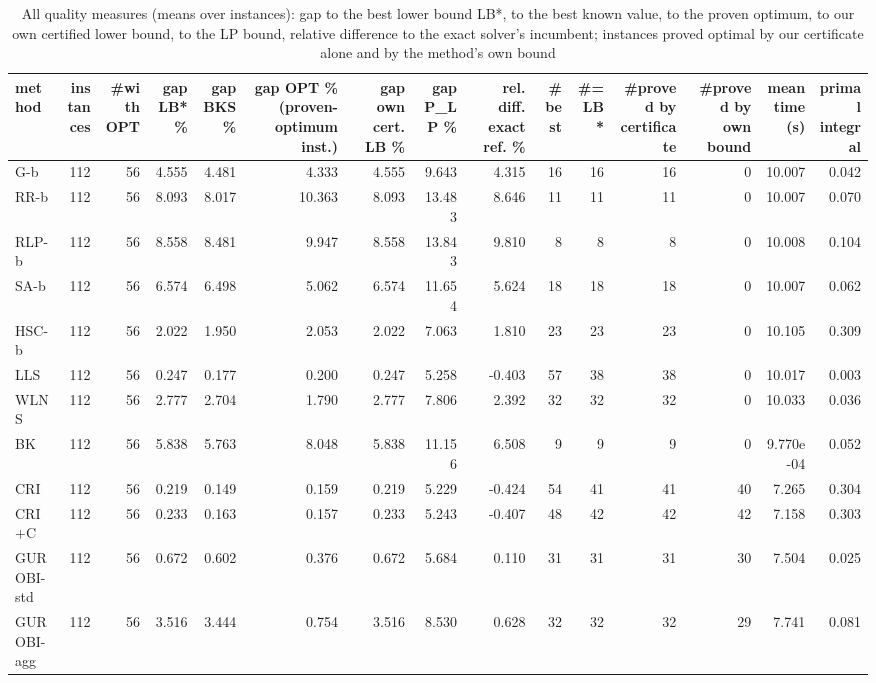 \begin{table}[htbp]
\centering
\small
\caption{All quality measures (means over instances): gap to the best lower bound LB*, to the best known value, to the proven optimum, to our own certified lower bound, to the LP bound, relative difference to the exact solver's incumbent; instances proved optimal by our certificate alone and by the method's own bound}
\label{tab:E4a_equal_budgets_b10_all_metrics}
\begin{tabular}{lrrrrrrrrrrrrrr}
\toprule
method & instances & \#with OPT & gap LB* \% & gap BKS \% & gap OPT \% (proven-optimum inst.) & gap own cert. LB \% & gap P\_LP \% & rel. diff. exact ref. \% & \#best & \#= LB* & \#proved by certificate & \#proved by own bound & mean time (s) & primal integral \\
\midrule
G-b & 112 & 56 & 4.555 & 4.481 & 4.333 & 4.555 & 9.643 & 4.315 & 16 & 16 & 16 & 0 & 10.007 & 0.042 \\
RR-b & 112 & 56 & 8.093 & 8.017 & 10.363 & 8.093 & 13.483 & 8.646 & 11 & 11 & 11 & 0 & 10.007 & 0.070 \\
RLP-b & 112 & 56 & 8.558 & 8.481 & 9.947 & 8.558 & 13.843 & 9.810 & 8 & 8 & 8 & 0 & 10.008 & 0.104 \\
SA-b & 112 & 56 & 6.574 & 6.498 & 5.062 & 6.574 & 11.654 & 5.624 & 18 & 18 & 18 & 0 & 10.007 & 0.062 \\
HSC-b & 112 & 56 & 2.022 & 1.950 & 2.053 & 2.022 & 7.063 & 1.810 & 23 & 23 & 23 & 0 & 10.105 & 0.309 \\
LLS & 112 & 56 & 0.247 & 0.177 & 0.200 & 0.247 & 5.258 & -0.403 & 57 & 38 & 38 & 0 & 10.017 & 0.003 \\
WLNS & 112 & 56 & 2.777 & 2.704 & 1.790 & 2.777 & 7.806 & 2.392 & 32 & 32 & 32 & 0 & 10.033 & 0.036 \\
BK & 112 & 56 & 5.838 & 5.763 & 8.048 & 5.838 & 11.156 & 6.508 & 9 & 9 & 9 & 0 & 9.770e-04 & 0.052 \\
CRI & 112 & 56 & 0.219 & 0.149 & 0.159 & 0.219 & 5.229 & -0.424 & 54 & 41 & 41 & 40 & 7.265 & 0.304 \\
CRI+C & 112 & 56 & 0.233 & 0.163 & 0.157 & 0.233 & 5.243 & -0.407 & 48 & 42 & 42 & 42 & 7.158 & 0.303 \\
GUROBI-std & 112 & 56 & 0.672 & 0.602 & 0.376 & 0.672 & 5.684 & 0.110 & 31 & 31 & 31 & 30 & 7.504 & 0.025 \\
GUROBI-agg & 112 & 56 & 3.516 & 3.444 & 0.754 & 3.516 & 8.530 & 0.628 & 32 & 32 & 32 & 29 & 7.741 & 0.081 \\
\bottomrule
\end{tabular}
\end{table}
